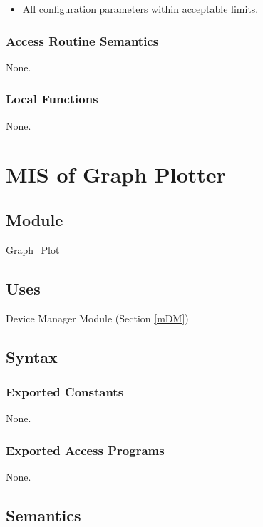 \documentclass[12pt, titlepage]{article}
\begin{document}
\begin{itemize}
\item All configuration parameters within acceptable limits.
\end{itemize}

\subsubsection{Access Routine Semantics}

None.

\subsubsection{Local Functions}

None.

\section{MIS of Graph Plotter} \label{mGP} 

\subsection{Module}

Graph\_Plot

\subsection{Uses}

Device Manager Module (Section \ref{mDM})

\subsection{Syntax}

\subsubsection{Exported Constants}

None.

\subsubsection{Exported Access Programs}

None.

\subsection{Semantics}
\end{document}
